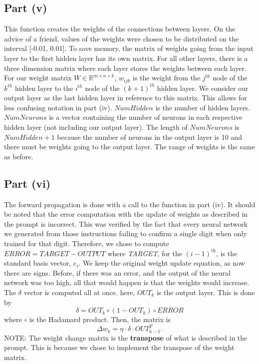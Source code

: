 \documentclass[12pt]{article}
\newcommand{\R}{\mathbb{R}}
\begin{document}
\subsection*{Part (v)}
This function creates the weights of the connections between layers.
On the advice of a friend, values of the weights were chosen to be distributed on the interval [-0.01, 0.01].
To save memory, the matrix of weights going from the input layer to the first hidden layer has its own matrix.
For all other layers, there is a three dimension matrix where each layer stores the weights between each layer.
For our weight matrix $W\in\R^{m\times n\times k}$, $w_{ijk}$ is the weight from the $j^{th}$ node of the $k^{th}$ hidden layer to the $i^{th}$ node of the $(k+1)^{th}$ hidden layer. We consider our output layer as the last hidden layer in reference to this matrix.
This allows for less confusing notation in part (iv).
$NumHidden$ is the number of hidden layers.
$NumNeurons$ is a vector containing the number of neurons in each respective hidden layer (not including our output layer).
The length of $NumNeurons$ is $NumHidden+1$ because the number of neurons in the output layer is 10 and there must be weights going to the output layer.
The range of weights is the same as before.
\subsection*{Part (vi)}
The forward propagation is done with a call to the function in part (iv).
It should be noted that the error computation with the update of 
weights as described in the prompt is incorrect.
This was verified by the fact that every neural network we generated from those instructions failing to confirm a single digit when only trained for that digit.
Therefore, we chose to compute $ERROR=TARGET-OUTPUT$ where \emph{TARGET}, for the $(i-1)^\text{th}$, is the standard basis vector, $e_i$.
We keep the original weight update equation, as now there are signs.
Before, if there was an error, and the output of the neural network was too high, all that would happen is that the weights would increase.
The $\delta$ vector is computed all at once.
here, $OUT_k$ is the output layer.
This is done by \[\delta = OUT_k \circ (1-OUT_k) \circ ERROR\]
where $\circ$ is the Hadamard product.
Then, the matrix is \[\Delta w_k = \eta \cdot \delta \cdot OUT_{k-1}^T.\]
NOTE: The weight change matrix is the \textbf{transpose} of what is described in the prompt.  
This is because we chose to implement the transpose of the weight matrix.
\end{document}
